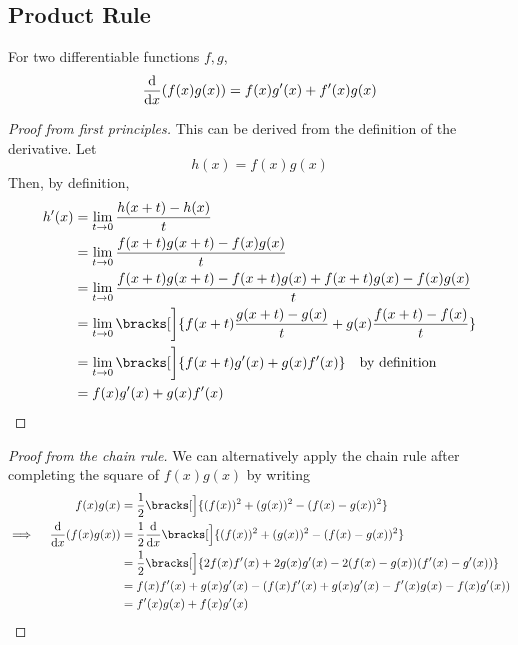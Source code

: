 \subsection{Product Rule} \label{sec_calc_product}

\begin{theorem}
 For two differentiable functions \(f, g\),
 \begin{equation*}
  \dv{x} (f(x)g(x)) = f(x)g'(x) + f'(x)g(x)
 \end{equation*}
\end{theorem}
\begin{proof}[Proof from first principles]
 This can be derived from the definition of the derivative. Let
 \begin{equation*}
  h(x) = f(x)g(x)
 \end{equation*}
 Then, by definition,
 \begin{align*}
  h'(x) &= \lim_{t \to 0} \frac{h(x + t) - h(x)} t \\
        &= \lim_{t \to 0} \frac{f(x + t)g(x + t) - f(x)g(x)} t \\
        &= \lim_{t \to 0} \frac{f(x + t)g(x + t) - f(x + t)g(x)
                              + f(x + t)g(x) - f(x)g(x)} t \\
        &= \lim_{t \to 0} \bracks[\bigg]{
            f(x + t) \frac{g(x + t) - g(x)} t
          + g(x) \frac{f(x + t) - f(x)} t} \\
        &= \lim_{t \to 0} \bracks[\bigg]{
            f(x + t)g'(x)
          + g(x) f'(x)} \quad \text{by definition} \\
        &= f(x)g'(x) + g(x)f'(x)
  \qedhere
 \end{align*}
\end{proof}
\begin{proof}[Proof from the chain rule]
 We can alternatively apply the chain rule after completing the square of
 \(f(x)g(x)\) by writing
 \begin{alignat*}{2}
  && f(x)g(x) &= \frac 12 \bracks[\Big]
                  {(f(x))^2 + (g(x))^2 - (f(x) - g(x))^2} \\
  \implies{}&& \dv{x} (f(x)g(x))
              &= \frac 12 \dv{x} \bracks[\Big]
                  {(f(x))^2 + (g(x))^2 - (f(x) - g(x))^2} \\
  &&          &= \frac 12 \bracks[\Big]
                  {2f(x)f'(x) + 2g(x)g'(x)
                 - 2(f(x) - g(x))(f'(x) - g'(x))} \\
  &&          &= f(x)f'(x) + g(x)g'(x)
               - (f(x)f'(x) + g(x)g'(x) - f'(x)g(x) - f(x)g'(x)) \\
  &&          &= f'(x)g(x) + f(x)g'(x) \qedhere
 \end{alignat*}
\end{proof}
